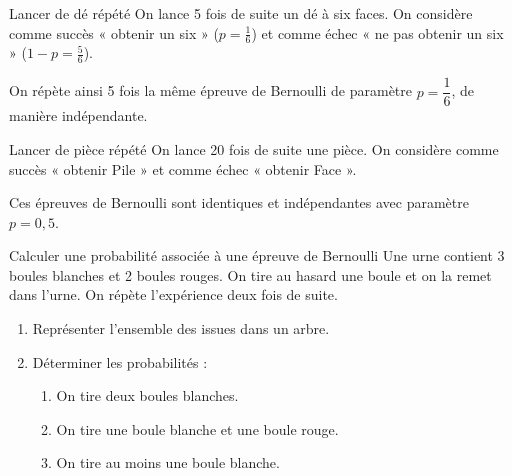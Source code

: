 \begin{ex}{Lancer de dé répété}
	On lance 5 fois de suite un dé à six faces. On considère comme succès
	« obtenir un six » ($p = \frac{1}{6}$) et comme échec « ne pas obtenir
	un six » ($1-p = \frac{5}{6}$).

	On répète ainsi 5 fois la même épreuve de Bernoulli de paramètre
	$p = \dfrac{1}{6}$, de manière indépendante.

	\begin{center}
	\end{center}
\end{ex}

\begin{ex}{Lancer de pièce répété}
	On lance 20 fois de suite une pièce. On considère comme succès
	« obtenir Pile » et comme échec « obtenir Face ».

	Ces épreuves de Bernoulli sont identiques et indépendantes avec
	paramètre $p = 0{,}5$.
\end{ex}

\begin{methode}{Calculer une probabilité associée à une épreuve de Bernoulli}
	Une urne contient 3 boules blanches et 2 boules rouges. On tire au
	hasard une boule et on la remet dans l'urne. On répète l'expérience
	deux fois de suite.

	\begin{enumerate}
		\item Représenter l'ensemble des issues dans un arbre.
		\item Déterminer les probabilités :
		      \begin{enumerate}
			      \item On tire deux boules blanches.
			      \item On tire une boule blanche et une boule rouge.
			      \item On tire au moins une boule blanche.
		      \end{enumerate}
	\end{enumerate}
\end{methode}

